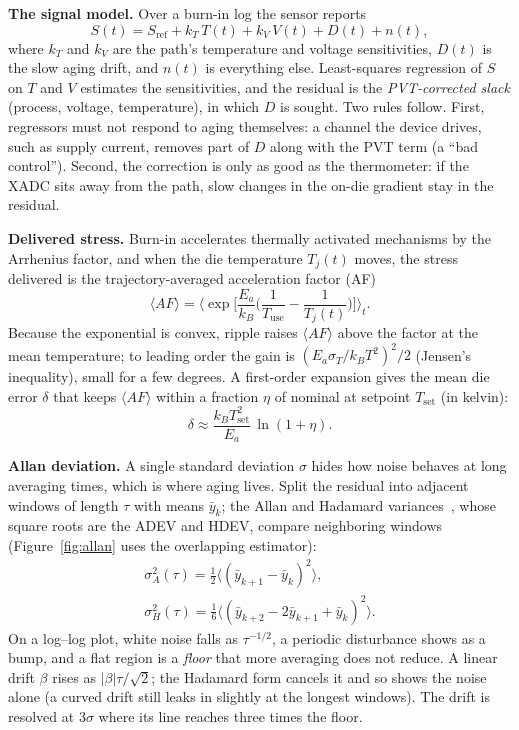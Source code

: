 \documentclass[10pt,twocolumn]{article}
\begin{document}
\textbf{The signal model.} Over a burn-in log the sensor reports
\begin{equation}
S(t)=S_{\mathrm{ref}}+k_T\,T(t)+k_V\,V(t)+D(t)+n(t),
\label{eq:model}
\end{equation}
where $k_T$ and $k_V$ are the path's temperature and voltage sensitivities, $D(t)$ is the slow aging drift, and $n(t)$ is everything else. Least-squares regression of $S$ on $T$ and $V$ estimates the sensitivities, and the residual is the \emph{PVT-corrected slack} (process, voltage, temperature), in which $D$ is sought. Two rules follow. First, regressors must not respond to aging themselves: a channel the device drives, such as supply current, removes part of $D$ along with the PVT term (a ``bad control''). Second, the correction is only as good as the thermometer: if the XADC sits away from the path, slow changes in the on-die gradient stay in the residual.

\textbf{Delivered stress.} Burn-in accelerates thermally activated mechanisms by the Arrhenius factor, and when the die temperature $T_j(t)$ moves, the stress delivered is the trajectory-averaged acceleration factor (AF)
\begin{equation}
\langle AF\rangle=\Big\langle \exp\!\Big[\frac{E_a}{k_B}\Big(\frac{1}{T_{\mathrm{use}}}-\frac{1}{T_j(t)}\Big)\Big]\Big\rangle_t .
\label{eq:af}
\end{equation}
Because the exponential is convex, ripple raises $\langle AF\rangle$ above the factor at the mean temperature; to leading order the gain is $(E_a\sigma_T/k_BT^2)^2/2$ (Jensen's inequality), small for a few degrees. A first-order expansion gives the mean die error $\delta$ that keeps $\langle AF\rangle$ within a fraction $\eta$ of nominal at setpoint $T_{\mathrm{set}}$ (in kelvin):
\begin{equation}
\delta\approx\frac{k_B T_{\mathrm{set}}^2}{E_a}\,\ln(1+\eta).
\label{eq:delta}
\end{equation}

\textbf{Allan deviation.} A single standard deviation $\sigma$ hides how noise behaves at long averaging times, which is where aging lives. Split the residual into adjacent windows of length $\tau$ with means $\bar y_k$; the Allan and Hadamard variances~\cite{allan}, whose square roots are the ADEV and HDEV, compare neighboring windows (Figure~\ref{fig:allan} uses the overlapping estimator):
\begin{gather}
\sigma_A^2(\tau)=\frac{1}{2}\big\langle(\bar y_{k+1}-\bar y_k)^2\big\rangle,\nonumber\\
\sigma_H^2(\tau)=\frac{1}{6}\big\langle(\bar y_{k+2}-2\bar y_{k+1}+\bar y_k)^2\big\rangle.
\label{eq:allan}
\end{gather}
On a log--log plot, white noise falls as $\tau^{-1/2}$, a periodic disturbance shows as a bump, and a flat region is a \emph{floor} that more averaging does not reduce. A linear drift $\beta$ rises as $|\beta|\tau/\sqrt2$; the Hadamard form cancels it and so shows the noise alone (a curved drift still leaks in slightly at the longest windows). The drift is resolved at 3$\sigma$ where its line reaches three times the floor.
\end{document}
